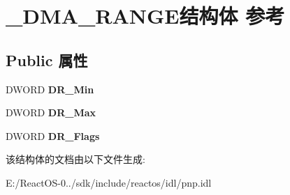 \hypertarget{struct___d_m_a___r_a_n_g_e}{}\section{\+\_\+\+D\+M\+A\+\_\+\+R\+A\+N\+G\+E结构体 参考}
\label{struct___d_m_a___r_a_n_g_e}
\subsection*{Public 属性}
\begin{DoxyCompactItemize}
\item 
\mbox{\label{struct___d_m_a___r_a_n_g_e_a80af7a44545f40e642bfd6c80ef6dd5a}} 
D\+W\+O\+RD {\bfseries D\+R\+\_\+\+Min}
\item 
\mbox{\label{struct___d_m_a___r_a_n_g_e_a17498af924f9cdc22237f13bfa18691e}} 
D\+W\+O\+RD {\bfseries D\+R\+\_\+\+Max}
\item 
\mbox{\label{struct___d_m_a___r_a_n_g_e_a6c45a3381dcd53cfd2e57b27eb2ecd13}} 
D\+W\+O\+RD {\bfseries D\+R\+\_\+\+Flags}
\end{DoxyCompactItemize}


该结构体的文档由以下文件生成\+:\begin{DoxyCompactItemize}
\item 
E\+:/\+React\+O\+S-\/0../sdk/include/reactos/idl/pnp.\+idl\end{DoxyCompactItemize}
